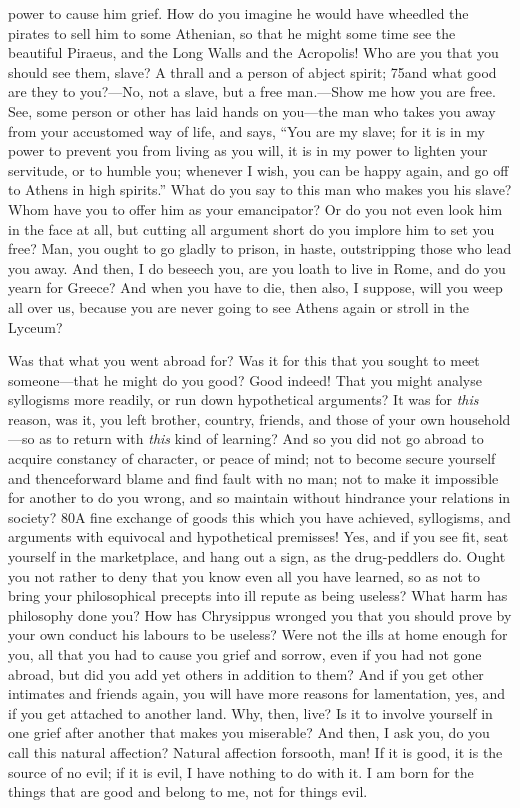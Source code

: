 power to cause him grief. How do you imagine he would have wheedled the pirates to sell him to some Athenian, so that he might some time see the beautiful Piraeus, and the Long Walls and the Acropolis! Who are you that you should see them, slave? A thrall and a person of abject spirit; 75and what good are they to you?—No, not a slave, but a free man.—Show me how you are free. See, some person or other has laid hands on you—the man who takes you away from your accustomed way of life, and says, ``You are my slave; for it is in my power to prevent you from living as you will, it is in my power to lighten your servitude, or to humble you; whenever I wish, you can be happy again, and go off to Athens in high spirits.'' What do you say to this man who makes you his slave? Whom have you to offer him as your emancipator? Or do you not even look him in the face at all, but cutting all argument short do you implore him to set you free? Man, you ought to go gladly to prison, in haste, outstripping those who lead you away. And then, I do beseech you, are you loath to live in Rome, and do you yearn for Greece? And when you have to die, then also, I suppose, will you weep all over us, because you are never going to see Athens again or stroll in the Lyceum?

Was that what you went abroad for? Was it for this that you sought to meet someone—that he might do you good? Good indeed! That you might analyse syllogisms more readily, or run down hypothetical arguments? It was for \emph{this} reason, was it, you left brother, country, friends, and those of your own household—so as to return with \emph{this} kind of learning? And so you did not go abroad to acquire constancy of character, or peace of mind; not to become secure yourself and thenceforward blame and find fault with no man; not to make it impossible for another to do you wrong, and so maintain without hindrance your relations in society? 80A fine exchange of goods this which you have achieved, syllogisms, and arguments with equivocal and hypothetical premisses! Yes, and if you see fit, seat yourself in the marketplace, and hang out a sign, as the drug-peddlers do. Ought you not rather to deny that you know even all you have learned, so as not to bring your philosophical precepts into ill repute as being useless? What harm has philosophy done you? How has Chrysippus wronged you that you should prove by your own conduct his labours to be useless? Were not the ills at home enough for you, all that you had to cause you grief and sorrow, even if you had not gone abroad, but did you add yet others in addition to them? And if you get other intimates and friends again, you will have more reasons for lamentation, yes, and if you get attached to another land. Why, then, live? Is it to involve yourself in one grief after another that makes you miserable? And then, I ask you, do you call this natural affection? Natural affection forsooth, man! If it is good, it is the source of no evil; if it is evil, I have nothing to do with it. I am born for the things that are good and belong to me, not for things evil.

